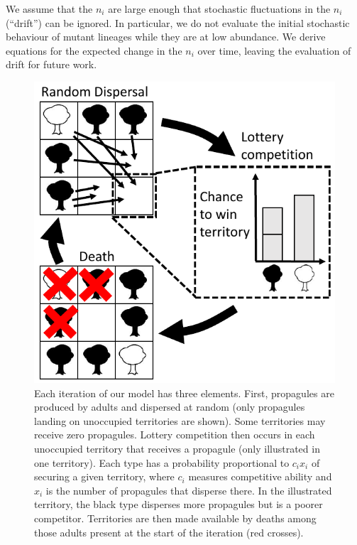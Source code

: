 \documentclass[11pt]{article}
\begin{document}
We assume that the $n_i$ are large enough that stochastic fluctuations in the $n_i$ (``drift'') can be ignored. In particular, we do not evaluate the initial stochastic behaviour of mutant lineages while they are at low abundance. We derive equations for the expected change in the $n_i$ over time, leaving the evaluation of drift for future work.  


\begin{figure}
\centering
\includegraphics[scale=0.8]{lottery.pdf}
\caption{\label{fig:lottery} Each iteration of our model has three elements. First, propagules are produced by adults and dispersed at random (only propagules landing on unoccupied territories are shown). Some territories may receive zero propagules. Lottery competition then occurs in each unoccupied territory that receives a propagule (only illustrated in one territory). Each type has a probability proportional to $c_i x_i$ of securing a given territory, where $c_i$ measures competitive ability and $x_i$ is the number of propagules that disperse there. In the illustrated territory, the black type disperses more propagules but is a poorer competitor. Territories are then made available by deaths among those adults present at the start of the iteration (red crosses).}
\end{figure}
\end{document}
